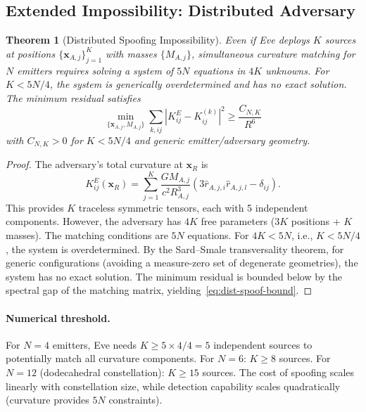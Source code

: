 \documentclass[twocolumn,superscriptaddress,prd,nofootinbib]{revtex4-2}
\newcommand{\xvec}{\mathbf{x}}
\newtheorem{theorem}{Theorem}
\begin{document}
\subsection{Extended Impossibility: Distributed Adversary}

\begin{theorem}[Distributed Spoofing Impossibility]\label{thm:dist-spoof}
Even if Eve deploys $K$ sources at positions $\{\xvec_{A,j}\}_{j=1}^K$
with masses $\{M_{A,j}\}$, simultaneous curvature matching for $N$
emitters requires solving a system of $5N$ equations in $4K$ unknowns.
For $K < 5N/4$, the system is generically overdetermined and has no
exact solution. The minimum residual satisfies
\begin{equation}
\min_{\{\xvec_{A,j}, M_{A,j}\}} \sum_{k,ij}
|K_{ij}^E - K_{ij}^{(k)}|^2 \geq \frac{C_{N,K}}{R^6}
\label{eq:dist-spoof-bound}
\end{equation}
with $C_{N,K} > 0$ for $K < 5N/4$ and generic emitter/adversary
geometry.
\end{theorem}

\begin{proof}
The adversary's total curvature at $\xvec_R$ is
\begin{equation}
K_{ij}^E(\xvec_R) = \sum_{j=1}^K \frac{GM_{A,j}}{c^2 R_{A,j}^3}
(3\hat{r}_{A,j,i}\hat{r}_{A,j,l} - \delta_{ij}).
\end{equation}
This provides $K$ traceless symmetric tensors, each with 5 independent
components. However, the adversary has $4K$ free parameters ($3K$
positions + $K$ masses). The matching conditions are $5N$ equations.
For $4K < 5N$, i.e., $K < 5N/4$, the system is overdetermined. By
the Sard--Smale transversality theorem, for generic configurations
(avoiding a measure-zero set of degenerate geometries), the system
has no exact solution. The minimum residual is bounded below by the
spectral gap of the matching matrix, yielding~\eqref{eq:dist-spoof-bound}.
\end{proof}

\paragraph{Numerical threshold.}
For $N = 4$ emitters, Eve needs $K \geq 5\times 4/4 = 5$ independent
sources to potentially match all curvature components. For $N = 6$:
$K \geq 8$ sources. For $N = 12$ (dodecahedral constellation):
$K \geq 15$ sources. The cost of spoofing scales linearly with
constellation size, while detection capability scales quadratically
(curvature provides $5N$ constraints).
\end{document}
